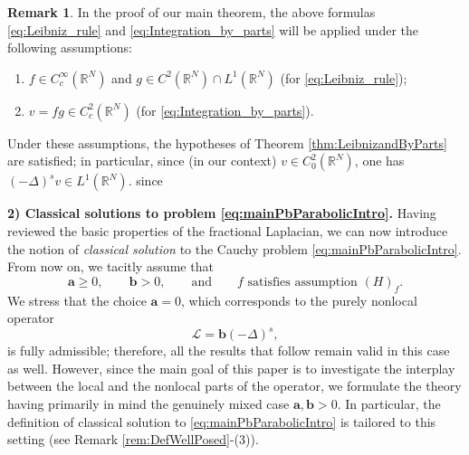 \documentclass[11pt,a4paper,reqno]{amsart}
\def \R {\mathbb{R}}
\def \LL {\mathcal{L}}
\theoremstyle{definition}
\newtheorem{remark}[definition]{Remark}
\theoremstyle{plain}
\numberwithin{equation}{section}
\begin{document}
\begin{remark} \label{rem:HowtouseFormula}
In the proof of our main theorem, the above formulas \eqref{eq:Leibniz_rule}
and \eqref{eq:Integration_by_parts} will be applied under the following assumptions:
\begin{enumerate}
\item $f\in C_c^\infty(\R^N)$ and $g\in C^2(\R^N)\cap L^1(\R^N)$
(for \eqref{eq:Leibniz_rule});
\vspace{0.1cm}

\item  $v=fg\in C_c^2(\R^N)$
(for \eqref{eq:Integration_by_parts}).
\end{enumerate}
Under these assumptions, the hypotheses of Theorem
\ref{thm:LeibnizandByParts} are satisfied; in particular,
since (in our context) $v\in C^2_0(\R^N)$, one has
$(-\Delta)^s v\in L^1(\R^N)$.
since
\end{remark}


\noindent \textbf{2) Classical solutions to problem \eqref{eq:mainPbParabolicIntro}.}
Having reviewed the basic properties of the fractional Laplacian, we can now introduce the notion of \emph{classical solution} to the Cauchy problem \eqref{eq:mainPbParabolicIntro}. From now on, we tacitly assume that
$$\mathbf{a} \geq 0,\qquad \mathbf{b}>0,\qquad \text{and}\qquad \text{$f$ satisfies assumption $(H)_f$}.$$
We stress that the choice $\mathbf{a}=0$,
which corresponds to the purely nonlocal operator
$$\LL=\mathbf{b}(-\Delta)^s,$$
is fully admissible; therefore, all the results that follow remain valid in this case as well. However, since the main goal of this paper is to investigate the interplay between the local and the nonlocal parts of the operator, we formulate the theory having primarily in mind the genuinely mixed case $\mathbf{a},\mathbf{b}>0$. In particular, the definition of classical solution to \eqref{eq:mainPbParabolicIntro} is tailored to this setting (see Remark \ref{rem:DefWellPosed}-(3)).
\end{document}
